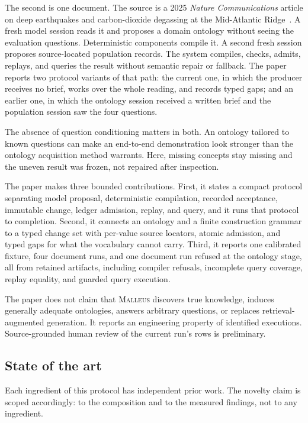 \documentclass[10pt]{article}
\newcommand{\malleus}{\textsc{Malleus}}
\begin{document}
The second is one document. The source is a 2025 \emph{Nature Communications} article on deep earthquakes and carbon-dioxide degassing at the Mid-Atlantic Ridge~\citep{yu2025deep}. A fresh model session reads it and proposes a domain ontology without seeing the evaluation questions. Deterministic components compile it. A second fresh session proposes source-located population records. The system compiles, checks, admits, replays, and queries the result without semantic repair or fallback. The paper reports two protocol variants of that path: the current one, in which the producer receives no brief, works over the whole reading, and records typed gaps; and an earlier one, in which the ontology session received a written brief and the population session saw the four questions.

The absence of question conditioning matters in both. An ontology tailored to known questions can make an end-to-end demonstration look stronger than the ontology acquisition method warrants. Here, missing concepts stay missing and the uneven result was frozen, not repaired after inspection.

The paper makes three bounded contributions. First, it states a compact protocol separating model proposal, deterministic compilation, recorded acceptance, immutable change, ledger admission, replay, and query, and it runs that protocol to completion. Second, it connects an ontology and a finite construction grammar to a typed change set with per-value source locators, atomic admission, and typed gaps for what the vocabulary cannot carry. Third, it reports one calibrated fixture, four document runs, and one document run refused at the ontology stage, all from retained artifacts, including compiler refusals, incomplete query coverage, replay equality, and guarded query execution.

The paper does not claim that \malleus{} discovers true knowledge, induces generally adequate ontologies, answers arbitrary questions, or replaces retrieval-augmented generation. It reports an engineering property of identified executions. Source-grounded human review of the current run's rows is preliminary.

\subsection{State of the art}

Each ingredient of this protocol has independent prior work. The novelty claim is scoped accordingly: to the composition and to the measured findings, not to any ingredient.
\end{document}
